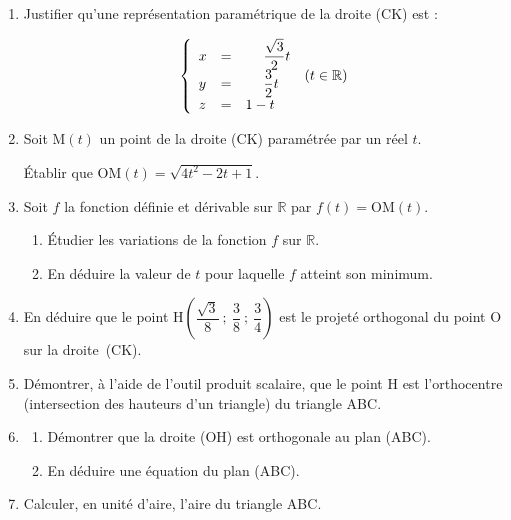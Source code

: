 \documentclass[10pt]{article}
\providecommand{\R}{\mathbb{R}}
\begin{document}
\begin{enumerate}
\item Justifier qu'une représentation paramétrique de la droite (CK) est :

\renewcommand\arraystretch{1.7}
\[\left\{\begin{array}{l c l}
x&=&\phantom{1-}\dfrac{\sqrt 3}{2}t\\
y&=&\phantom{1-}\dfrac32 t\\
z&=&1 - t
\end{array}\right. \: (t \in \R)\]
\renewcommand\arraystretch{1.}

\item Soit M$(t)$ un point de la droite (CK) paramétrée par un réel $t$.

Établir que OM$(t) = \sqrt{4t^2 - 2t + 1}$.
\item Soit $f$ la fonction définie et dérivable sur $\R$ par $f(t) = \text{OM}(t)$.
	\begin{enumerate}
		\item Étudier les variations de la fonction $f$ sur $\R$.
		\item En déduire la valeur de $t$ pour laquelle $f$ atteint son minimum.
	\end{enumerate}
\item En déduire que le point H$\left(\dfrac{\sqrt3}{8}~;~\dfrac38~;~\dfrac34\right)$ est le projeté orthogonal du point O sur la droite~(CK).
\item Démontrer, à l'aide de l'outil produit scalaire, que le point H est l'orthocentre (intersection des hauteurs d'un triangle) du triangle ABC.
\item 
	\begin{enumerate}
		\item Démontrer que la droite (OH) est orthogonale au plan (ABC).
		\item En déduire une équation du plan (ABC). 
	\end{enumerate}
	\item Calculer, en unité d'aire, l'aire du triangle ABC.
\end{enumerate}
\end{document}
